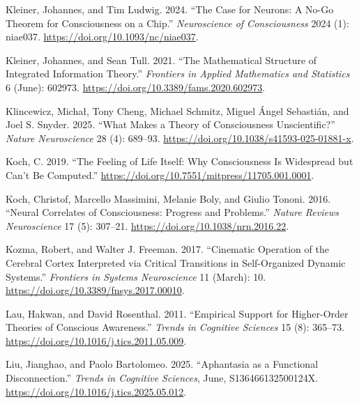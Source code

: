 \documentclass[
  a4paper]{article}
\newlength{\cslhangindent}
\newenvironment{CSLReferences}[2] %
 {\begin{list}{}{%
  \setlength{\itemindent}{0pt}
  \setlength{\leftmargin}{0pt}
  \setlength{\parsep}{0pt}
  \ifodd #1
   \setlength{\leftmargin}{\cslhangindent}
   \setlength{\itemindent}{-1\cslhangindent}
  \fi
  \setlength{\itemsep}{#2\baselineskip}}}
 {\end{list}}
\begin{document}
\begin{CSLReferences}{1}{0}
Kleiner, Johannes, and Tim Ludwig. 2024. {``The Case for Neurons: A
No-Go Theorem for Consciousness on a Chip.''} \emph{Neuroscience of
Consciousness} 2024 (1): niae037.
\url{https://doi.org/10.1093/nc/niae037}.

Kleiner, Johannes, and Sean Tull. 2021. {``The Mathematical Structure of
Integrated Information Theory.''} \emph{Frontiers in Applied Mathematics
and Statistics} 6 (June): 602973.
\url{https://doi.org/10.3389/fams.2020.602973}.

Klincewicz, Michał, Tony Cheng, Michael Schmitz, Miguel Ángel Sebastián,
and Joel S. Snyder. 2025. {``What Makes a Theory of Consciousness
Unscientific?''} \emph{Nature Neuroscience} 28 (4): 689--93.
\url{https://doi.org/10.1038/s41593-025-01881-x}.

Koch, C. 2019. {``The Feeling of Life Itself: Why Consciousness Is
Widespread but Can't Be Computed.''}
\url{https://doi.org/10.7551/mitpress/11705.001.0001}.

Koch, Christof, Marcello Massimini, Melanie Boly, and Giulio Tononi.
2016. {``Neural Correlates of Consciousness: Progress and Problems.''}
\emph{Nature Reviews Neuroscience} 17 (5): 307--21.
\url{https://doi.org/10.1038/nrn.2016.22}.

Kozma, Robert, and Walter J. Freeman. 2017. {``Cinematic Operation of
the Cerebral Cortex Interpreted via Critical Transitions in
Self-Organized Dynamic Systems.''} \emph{Frontiers in Systems
Neuroscience} 11 (March): 10.
\url{https://doi.org/10.3389/fnsys.2017.00010}.

Lau, Hakwan, and David Rosenthal. 2011. {``Empirical Support for
Higher-Order Theories of Conscious Awareness.''} \emph{Trends in
Cognitive Sciences} 15 (8): 365--73.
\url{https://doi.org/10.1016/j.tics.2011.05.009}.

Liu, Jianghao, and Paolo Bartolomeo. 2025. {``Aphantasia as a Functional
Disconnection.''} \emph{Trends in Cognitive Sciences}, June,
S136466132500124X. \url{https://doi.org/10.1016/j.tics.2025.05.012}.


\end{CSLReferences}
\end{document}

